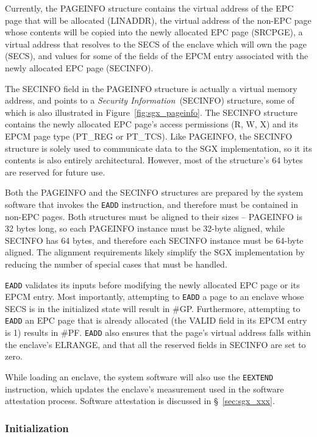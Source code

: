Currently, the PAGEINFO structure contains the virtual address of the EPC page
that will be allocated (LINADDR), the virtual address of the non-EPC page whose
contents will be copied into the newly allocated EPC page (SRCPGE), a virtual
address that resolves to the SECS of the enclave which will own the page
(SECS), and values for some of the fields of the EPCM entry associated with the
newly allocated EPC page (SECINFO).

The SECINFO field in the PAGEINFO structure is actually a virtual memory
address, and points to a \textit{Security Information}~(SECINFO) structure,
some of which is also illustrated in Figure~\ref{fig:sgx_pageinfo}. The SECINFO
structure contains the newly allocated EPC page's access permissions (R, W, X)
and its EPCM page type (PT\_REG or PT\_TCS). Like PAGEINFO, the SECINFO
structure is solely used to communicate data to the SGX implementation, so it
its contents is also entirely architectural. However, most of the structure's
64 bytes are reserved for future use.

Both the PAGEINFO and the SECINFO structures are prepared by the system
software that invokes the \texttt{EADD} instruction, and therefore must be
contained in non-EPC pages. Both structures must be aligned to their sizes --
PAGEINFO is 32 bytes long, so each PAGEINFO instance must be 32-byte aligned,
while SECINFO has 64 bytes, and therefore each SECINFO instance must be
64-byte aligned. The alignment requirements likely simplify the SGX
implementation by reducing the number of special cases that must be handled.

\texttt{EADD} validates its inputs before modifying the newly allocated EPC
page or its EPCM entry. Most importantly, attempting to \texttt{EADD} a page to
an enclave whose SECS is in the initialized state will result in \#GP.
Furthermore, attempting to \texttt{EADD} an EPC page that is already allocated
(the VALID field in its EPCM entry is 1) results in \#PF. \texttt{EADD} also
ensures that the page's virtual address falls within the enclave's ELRANGE, and
that all the reserved fields in SECINFO are set to zero.

While loading an enclave, the system software will also use the
\texttt{EEXTEND} instruction, which updates the enclave's measurement used in
the software attestation process. Software attestation is discussed in
\S~\ref{sec:sgx_xxx}.


\subsubsection{Initialization}
\label{sec:sgx_einit_overview}

